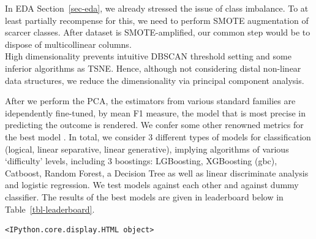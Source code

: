\documentclass[
  letterpaper,
  DIV=11,
  numbers=noendperiod]{scrartcl}
\begin{document}
In EDA Section~\ref{sec-eda}, we already stressed the issue of class
imbalance. To at least partially recompense for this, we need to perform
SMOTE augmentation of scarcer classes. After dataset is SMOTE-amplified,
our common step would be to dispose of multicollinear columns.\\
High dimensionality prevents intuitive DBSCAN threshold setting and some
inferior algorithms as TSNE. Hence, although not considering distal
non-linear data structures, we reduce the dimensionality via principal
component analysis.

After we perform the PCA, the estimators from various standard families
are idependently fine-tuned, by mean F1 measure, the model that is most
precise in predicting the outcome is rendered. We confer some other
renowned metrics for the best model . In total, we consider 3 different
types of models for classification (logical, linear separative, linear
generative), implying algorithms of various \enquote*{difficulty}
levels, including 3 boostings: LGBoosting, XGBoosting (gbc), Catboost,
Random Forest, a Decision Tree as well as linear discriminate analysis
and logistic regression. We test models against each other and against
dummy classifier. The results of the best models are given in
leaderboard below in Table~\ref{tbl-leaderboard}.

\begin{verbatim}
<IPython.core.display.HTML object>
\end{verbatim}
\end{document}
